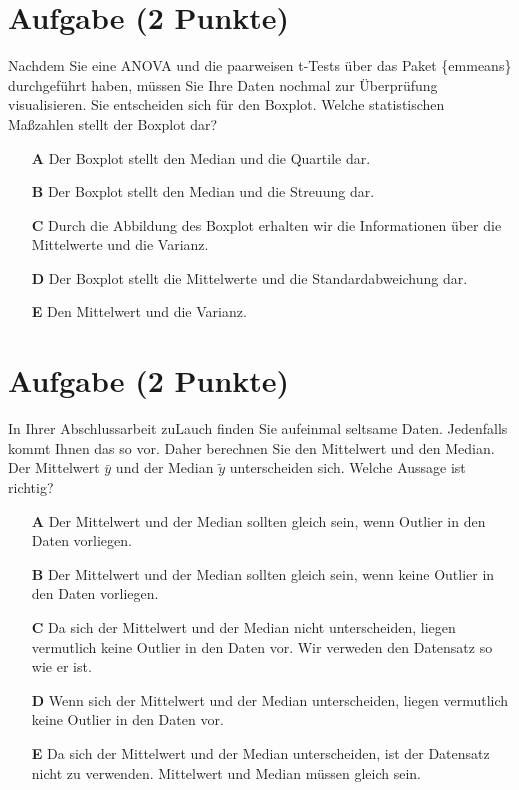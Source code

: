\documentclass[a4paper, 9pt]{scrartcl}\usepackage[]{graphicx}\usepackage[]{xcolor}
\begin{document}
\section{Aufgabe \hfill (2 Punkte)}



Nachdem Sie eine ANOVA und die paarweisen t-Tests über das \Rlogo Paket \{emmeans\} durchgeführt haben, müssen Sie Ihre Daten nochmal zur Überprüfung visualisieren. Sie entscheiden sich für den Boxplot. Welche statistischen Maßzahlen stellt der Boxplot dar?

 



\begin{enumerate}
\item [\textbf{A} \msquare] Der Boxplot stellt den Median und die Quartile dar.
\item [\textbf{B} \msquare] Der Boxplot stellt den Median und die Streuung dar.
\item [\textbf{C} \msquare] Durch die Abbildung des Boxplot erhalten wir die Informationen über die Mittelwerte und die Varianz.
\item [\textbf{D} \msquare] Der Boxplot stellt die Mittelwerte und die Standardabweichung dar.
\item [\textbf{E} \msquare] Den Mittelwert und die Varianz.
\end{enumerate}

\section{Aufgabe \hfill (2 Punkte)}



In Ihrer Abschlussarbeit zuLauch finden Sie aufeinmal seltsame Daten. Jedenfalls kommt Ihnen das so vor. Daher berechnen Sie den Mittelwert und den Median. Der Mittelwert $\bar{y}$ und der Median $\tilde{y}$ unterscheiden sich. Welche Aussage ist richtig?



\begin{enumerate}
\item [\textbf{A} \msquare] Der Mittelwert und der Median sollten gleich sein, wenn Outlier in den Daten vorliegen. 
\item [\textbf{B} \msquare] Der Mittelwert und der Median sollten gleich sein, wenn keine Outlier in den Daten vorliegen. 
\item [\textbf{C} \msquare] Da sich der Mittelwert und der Median nicht unterscheiden, liegen vermutlich keine Outlier in den Daten vor. Wir verweden den Datensatz so wie er ist.
\item [\textbf{D} \msquare] Wenn sich der Mittelwert und der Median unterscheiden, liegen vermutlich keine Outlier in den Daten vor.
\item [\textbf{E} \msquare] Da sich der Mittelwert und der Median unterscheiden, ist der Datensatz nicht zu verwenden. Mittelwert und Median müssen gleich sein.
\end{enumerate}
\end{document}
